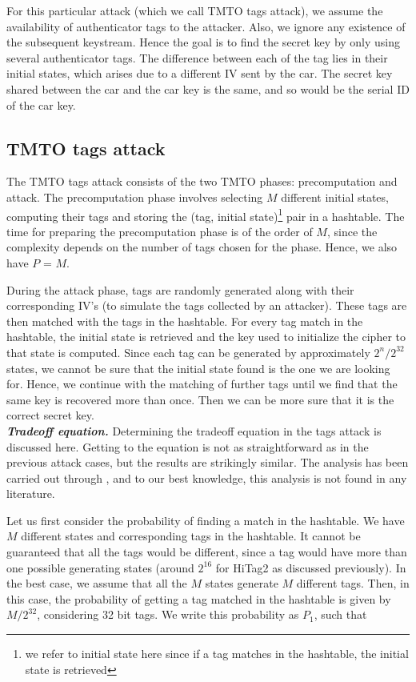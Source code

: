 For this particular attack (which we call TMTO tags attack), we assume the availability of authenticator tags to the attacker. Also, we ignore any existence of the subsequent keystream. Hence the goal is to find the secret key by only using several authenticator tags. The difference between each of the tag lies in their initial states, which arises due to a different IV sent by the car. The secret key shared between the car and the car key is the same, and so would be the serial ID of the car key.

\subsection{TMTO tags attack}

The TMTO tags attack consists of the two TMTO phases: precomputation and attack. The precomputation phase involves selecting $M$ different initial states, computing their tags and storing the (tag, initial state)\footnote{we refer to initial state here since if a tag matches in the hashtable, the initial state is retrieved} pair in a hashtable. The time for preparing the precomputation phase is of the order of $M$, since the complexity depends on the number of tags chosen for the phase. Hence, we also have $P$ = $M$.

During the attack phase, tags are randomly generated along with their corresponding IV's (to simulate the tags collected by an attacker). These tags are then matched with the tags in the hashtable. For every tag match in the hashtable, the initial state is retrieved and the key used to initialize the cipher to that state is computed. Since each tag can be generated by approximately $2^n/2^{32}$ states, we cannot be sure that the initial state found is the one we are looking for. Hence, we continue with the matching of further tags until we find that the same key is recovered more than once. Then we can be more sure that it is the correct secret key.\\

\noindent \textit{\textbf{Tradeoff equation.}} Determining the tradeoff equation in the tags attack is discussed here. Getting to the equation is not as straightforward as in the previous attack cases, but the results are strikingly similar. The analysis has been carried out through \cite{erik-discussions}, and to our best knowledge, this analysis is not found in any literature.

Let us first consider the probability of finding a match in the hashtable. We have $M$ different states and corresponding tags in the hashtable. It cannot be guaranteed that all the tags would be different, since a tag would have more than one possible generating states (around $2^{16}$ for HiTag2 as discussed previously). In the best case, we assume that all the $M$ states generate $M$ different tags. Then, in this case, the probability of getting a tag matched in the hashtable is given by $M/2^{32}$, considering 32 bit tags. We write this probability as $P_1$, such that

